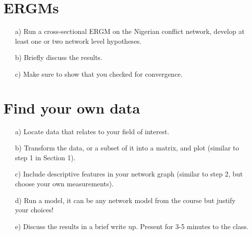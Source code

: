 \documentclass[12pt,letterpaper]{article}
\begin{document}
\section{ERGMs}

\begin{itemize}
	\item[a)] Run a cross-sectional ERGM on the Nigerian conflict network, develop at least one or two network level hypotheses.
	\item[b)] Briefly discuss the results.
	\item [c)] Make sure to show that you checked for convergence.
\end{itemize}

\section{Find your own data}

\begin{itemize}
	\item[a)] Locate data that relates to your field of interest.
	\item[b)] Transform the data, or a subset of it into a matrix, and plot (similar to step 1 in Section 1).
	\item [c)] Include descriptive features in your network graph (similar to step 2, but choose your own measurements).
	\item [d)] Run a model, it can be any network model from the course but justify your choices! 
	\item [e)] Discuss the results in a brief write up. Present for 3-5 minutes to the class.
\end{itemize}
\end{document}
